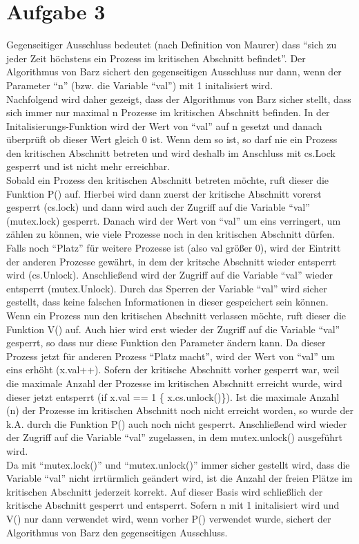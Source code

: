 \documentclass[11pt,a4paper,DIV=10,]{scrartcl}
\begin{document}
\section*{Aufgabe 3}

Gegenseitiger Ausschluss bedeutet (nach Definition von Maurer) dass ``sich zu jeder Zeit höchstens ein Prozess im kritischen Abschnitt befindet''. 
Der Algorithmus von Barz sichert den gegenseitigen Ausschluss nur dann, wenn der Parameter ``n'' (bzw. die Variable ``val'') mit 1 initalisiert wird. \\
Nachfolgend wird daher gezeigt, dass der Algorithmus von Barz sicher stellt, dass sich immer nur maximal n Prozesse im kritischen Abschnitt befinden. 
In der Initalisierungs-Funktion wird der Wert von ``val'' auf n gesetzt und danach überprüft ob dieser Wert gleich 0 ist. Wenn dem so ist, so darf nie ein Prozess den kritischen Abschnitt betreten und wird deshalb im Anschluss mit cs.Lock gesperrt und ist nicht mehr erreichbar. \\
Sobald ein Prozess den kritischen Abschnitt betreten möchte, ruft dieser die Funktion P() auf. Hierbei wird dann zuerst der kritische Abschnitt vorerst gesperrt (cs.lock) und dann wird auch der Zugriff auf die Variable ``val'' (mutex.lock) gesperrt. Danach wird der Wert von ``val'' um eins verringert, um zählen zu können, wie viele Prozesse noch in den kritischen Abschnitt dürfen. Falls noch ``Platz'' für weitere Prozesse ist (also val größer 0), wird der Eintritt der anderen Prozesse gewährt, in dem der kritsche Abschnitt wieder entsperrt wird (cs.Unlock). Anschließend wird der Zugriff auf die Variable ``val'' wieder entsperrt (mutex.Unlock). Durch das Sperren der Variable ``val'' wird sicher gestellt, dass keine falschen Informationen in dieser gespeichert sein können. \\
Wenn ein Prozess nun den kritischen Abschnitt verlassen möchte, ruft dieser die Funktion V() auf. Auch hier wird erst  wieder der Zugriff auf die Variable ``val'' gesperrt, so dass nur diese Funktion den Parameter ändern kann. Da dieser Prozess jetzt für anderen Prozess ``Platz macht'', wird der Wert von ``val'' um eins erhöht (x.val++). Sofern der kritische Abschnitt vorher gesperrt war, weil die maximale Anzahl der Prozesse im kritischen Abschnitt erreicht wurde, wird dieser jetzt entsperrt (if x.val == 1  \{ x.cs.unlock()\}). Ist die maximale Anzahl (n) der Prozesse im kritischen Abschnitt noch nicht erreicht worden, so wurde der k.A. durch die Funktion P() auch noch nicht gesperrt. Anschließend wird wieder der Zugriff auf die Variable ``val'' zugelassen, in dem mutex.unlock() ausgeführt wird. \\
Da mit ``mutex.lock()'' und ``mutex.unlock()'' immer sicher gestellt wird, dass die Variable ``val'' nicht irrtürmlich geändert wird, ist die Anzahl der freien Plätze im kritischen Abschnitt jederzeit korrekt. Auf dieser Basis wird schließlich der kritische Abschnitt gesperrt und entsperrt. Sofern n mit 1 initalisiert wird und V() nur dann verwendet wird, wenn vorher P() verwendet wurde, sichert der Algorithmus von Barz den gegenseitigen Ausschluss. 
\end{document}
